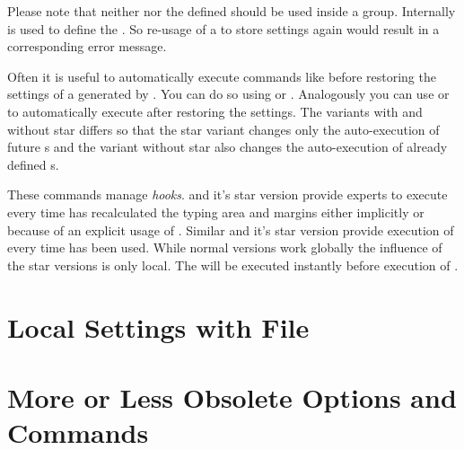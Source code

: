 Please note that neither  nor the
defined  should be used inside a group. Internally
 is
used to define the . So re-usage of a
 to store settings again would result in a
corresponding error message.

Often it is useful to automatically
execute commands like  before restoring the settings
of a  generated by . You can do so using
 or . Analogously you can
use  or  to automatically
execute  after restoring the settings. The variants with and
without star differs so that the star variant changes only the auto-execution
 of future s and the variant without star also
changes the auto-execution  of already defined s.
%
\EndIndexGroup


\begin{Declaration}
\end{Declaration}%
These commands manage \emph{hooks}.  and it's
star version provide experts to execute  every time
 has recalculated the typing area and margins either
implicitly or because of an explicit usage of . Similar
 and it's star
version provide execution of  every time 
has been used. While normal versions work globally the influence of the star
versions is only local. The  will be executed instantly
before execution of .%
% 
\EndIndexGroup


\section{Local Settings with File }
\BeginIndexGroup
{}

%
\EndIndexGroup

\section{More or Less Obsolete Options and Commands}
%
\EndIndexGroup

\endinput


